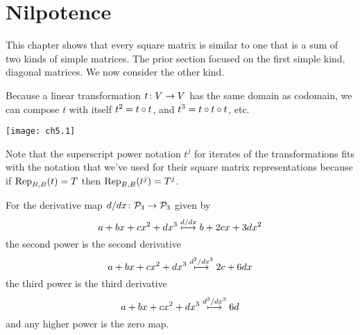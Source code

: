 \section{Nilpotence}
This chapter shows that every square matrix is similar to one
that is a sum of two kinds of simple matrices.
The prior section
focused on the first simple kind, diagonal matrices.
We now consider the other kind.










Because a linear transformation $\map{t}{V}{V}$ has the same domain as
codomain, we can
compose $t$ with itself 
\( t^2=\composed{t}{t} \), 
and \( t^3=\composed{t}{\composed{t}{t}} \), 
etc. %
\begin{center}
  \texttt{[image: ch5.1]}
\end{center}
Note that the superscript
power notation $t^j$ for iterates of the transformations 
fits with 
the notation that we've used for their square matrix representations
because if $\rep{t}{B,B}=T$ then \( \rep{t^j}{B,B}=T^j \).


\begin{example} \label{ex:DerivIter}
For the derivative map \( \map{d/dx}{\polyspace_3}{\polyspace_3} \)
given by 
\begin{equation*}
  a+bx+cx^2+dx^3\xmapsunder{d/dx} b+2cx+3dx^2
\end{equation*}
the second power is the second derivative
\begin{equation*}
  a+bx+cx^2+dx^3\xmapsunder{d^2/dx^2} 2c+6dx 
\end{equation*}
the third power is the third derivative
\begin{equation*}
  a+bx+cx^2+dx^3\xmapsunder{d^3/dx^3} 6d 
\end{equation*}
and any higher power is the zero map.
\end{example}


